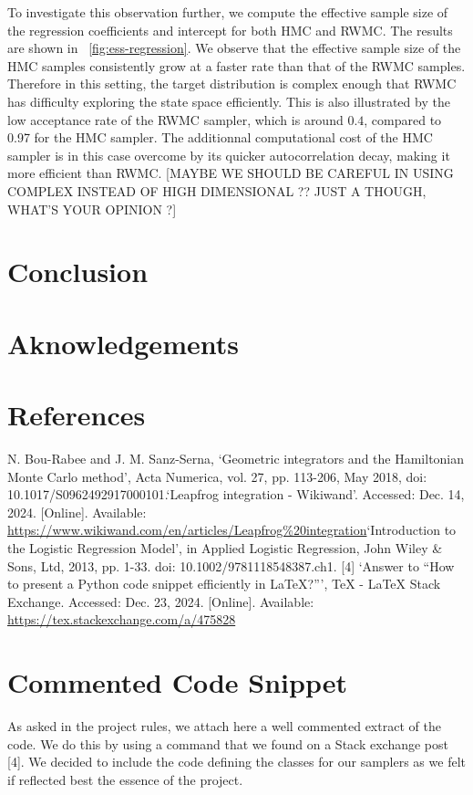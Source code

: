 \documentclass[a4paper, 12pt,oneside]{article}
\begin{document}
		To investigate this observation further, we compute the effective sample size of the regression coefficients and intercept for both HMC and RWMC. The results are shown in ~\ref{fig:ess-regression}. We observe that the effective sample size of the HMC samples consistently grow at a faster rate than that of the RWMC samples. Therefore in this setting, the target distribution is complex enough that RWMC has difficulty exploring the state space efficiently. This is also illustrated by the low acceptance rate of the RWMC sampler, which is around $0.4$, compared to 0.97 for the HMC sampler. The additionnal computational cost of the HMC sampler is in this case overcome by its quicker autocorrelation decay, making it more efficient than RWMC. [MAYBE WE SHOULD BE CAREFUL IN USING COMPLEX INSTEAD OF HIGH DIMENSIONAL ?? JUST A THOUGH, WHAT'S YOUR OPINION ?]
	\section{Conclusion}
	\section*{Aknowledgements}
	\newpage
	\section*{References}
	\noindent
	[1] N. Bou-Rabee and J. M. Sanz-Serna, `Geometric integrators and the Hamiltonian Monte Carlo method', Acta Numerica, vol. 27, pp. 113-206, May 2018, doi: 10.1017/S0962492917000101.\newline
	[2] `Leapfrog integration - Wikiwand'. Accessed: Dec. 14, 2024. [Online]. Available: \url{https://www.wikiwand.com/en/articles/Leapfrog%20integration}\newline
	[3] `Introduction to the Logistic Regression Model', in Applied Logistic Regression, John Wiley \& Sons, Ltd, 2013, pp. 1-33. doi: 10.1002/9781118548387.ch1.\newline
	[4] `Answer to “How to present a Python code snippet efficiently in LaTeX?”’, TeX - LaTeX Stack Exchange. Accessed: Dec. 23, 2024. [Online]. Available: \url{https://tex.stackexchange.com/a/475828}
	\appendix
		\section{Commented Code Snippet}\label{appendix:commented-code-snippet}
		As asked in the project rules, we attach here a well commented extract of the code. We do this by using a command that we found on a Stack exchange post [4]. We decided to include the code defining the classes for our samplers as we felt if reflected best the essence of the project.
\end{document}
